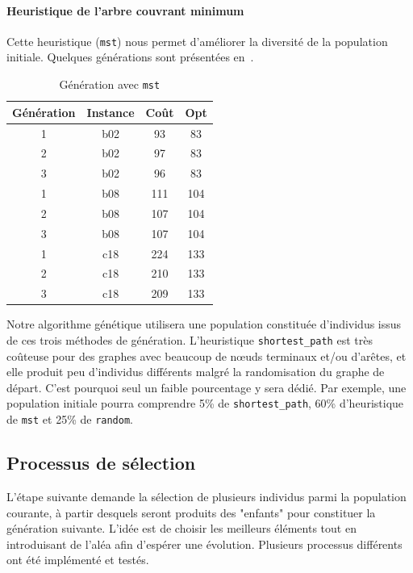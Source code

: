 \documentclass[10pt]{article}
\begin{document}
		\paragraph{Heuristique de l'arbre couvrant minimum}{
		Cette heuristique (\texttt{mst}) nous permet d'améliorer la diversité de la population initiale. Quelques générations sont présentées en~.
		
		\begin{table}[h!]
			\centering
			\begin{tabular}{|c|c|c|c|}
				\hline
				\textbf{Génération} & \textbf{Instance} & \textbf{Coût} & \textbf{Opt} \\
				\hline
				1&b02  & 93  &83 \\
				2&b02  & 97   &83\\
				3&b02  & 96  &83 \\
				1&b08  & 111  &104\\
				2&b08  & 107  &104\\
				3&b08  & 107  &104\\
				1&c18  & 224  &133\\
				2&c18  & 210  &133\\
				3&c18  & 209  &133\\
				\hline
			\end{tabular}
			\caption{Génération avec \texttt{mst}}
			\label{tab-mstinit}
		\end{table}
		}
		
		Notre algorithme génétique utilisera une population constituée d'individus issus de ces trois méthodes de génération. L'heuristique \texttt{shortest\_path} est très coûteuse pour des graphes avec beaucoup de nœuds terminaux et/ou d'arêtes, et elle produit peu d'individus différents malgré la randomisation du graphe de départ. C'est pourquoi seul un faible pourcentage y sera dédié. Par exemple, une population initiale pourra comprendre 5\% de \texttt{shortest\_path}, 60\% d'heuristique de \texttt{mst} et 25\% de \texttt{random}.

	\subsection{Processus de sélection}
		L'étape suivante demande la sélection de plusieurs individus parmi la population courante, à partir desquels seront produits des "enfants" pour constituer la génération suivante. L'idée est de choisir les meilleurs éléments tout en introduisant de l'aléa afin  d'espérer une évolution. Plusieurs processus différents ont été implémenté et testés.
		
\end{document}
